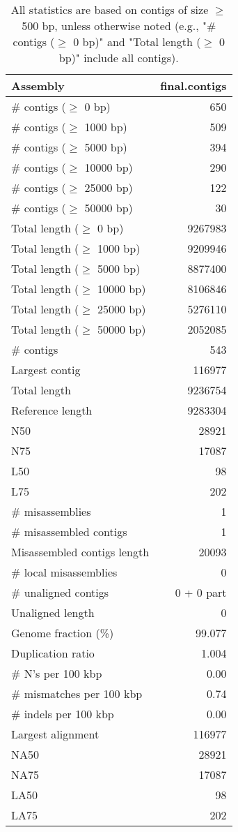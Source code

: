\documentclass[12pt,a4paper]{article}
\begin{document}
\begin{table}[ht]
\begin{center}
\caption{All statistics are based on contigs of size $\geq$ 500 bp, unless otherwise noted (e.g., "\# contigs ($\geq$ 0 bp)" and "Total length ($\geq$ 0 bp)" include all contigs).}
\begin{tabular}{|l*{1}{|r}|}
\hline
Assembly & final.contigs \\ \hline
\# contigs ($\geq$ 0 bp) & 650 \\ \hline
\# contigs ($\geq$ 1000 bp) & 509 \\ \hline
\# contigs ($\geq$ 5000 bp) & 394 \\ \hline
\# contigs ($\geq$ 10000 bp) & 290 \\ \hline
\# contigs ($\geq$ 25000 bp) & 122 \\ \hline
\# contigs ($\geq$ 50000 bp) & 30 \\ \hline
Total length ($\geq$ 0 bp) & 9267983 \\ \hline
Total length ($\geq$ 1000 bp) & 9209946 \\ \hline
Total length ($\geq$ 5000 bp) & 8877400 \\ \hline
Total length ($\geq$ 10000 bp) & 8106846 \\ \hline
Total length ($\geq$ 25000 bp) & 5276110 \\ \hline
Total length ($\geq$ 50000 bp) & 2052085 \\ \hline
\# contigs & 543 \\ \hline
Largest contig & 116977 \\ \hline
Total length & 9236754 \\ \hline
Reference length & 9283304 \\ \hline
N50 & 28921 \\ \hline
N75 & 17087 \\ \hline
L50 & 98 \\ \hline
L75 & 202 \\ \hline
\# misassemblies & 1 \\ \hline
\# misassembled contigs & 1 \\ \hline
Misassembled contigs length & 20093 \\ \hline
\# local misassemblies & 0 \\ \hline
\# unaligned contigs & 0 + 0 part \\ \hline
Unaligned length & 0 \\ \hline
Genome fraction (\%) & 99.077 \\ \hline
Duplication ratio & 1.004 \\ \hline
\# N's per 100 kbp & 0.00 \\ \hline
\# mismatches per 100 kbp & 0.74 \\ \hline
\# indels per 100 kbp & 0.00 \\ \hline
Largest alignment & 116977 \\ \hline
NA50 & 28921 \\ \hline
NA75 & 17087 \\ \hline
LA50 & 98 \\ \hline
LA75 & 202 \\ \hline
\end{tabular}
\end{center}
\end{table}
\end{document}
